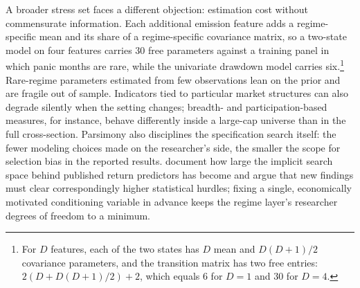 A broader stress set faces a different objection: estimation cost without commensurate information. Each additional emission feature adds a regime-specific mean and its share of a regime-specific covariance matrix, so a two-state model on four features carries 30 free parameters against a training panel in which panic months are rare, while the univariate drawdown model carries six.\footnote{For $D$ features, each of the two states has $D$ mean and $D(D+1)/2$ covariance parameters, and the transition matrix has two free entries: $2\left(D + D(D+1)/2\right) + 2$, which equals 6 for $D = 1$ and 30 for $D = 4$.} Rare-regime parameters estimated from few observations lean on the prior and are fragile out of sample. Indicators tied to particular market structures can also degrade silently when the setting changes; breadth- and participation-based measures, for instance, behave differently inside a large-cap universe than in the full cross-section. Parsimony also disciplines the specification search itself: the fewer modeling choices made on the researcher's side, the smaller the scope for selection bias in the reported results. \citet{HarveyLiuZhu2016} document how large the implicit search space behind published return predictors has become and argue that new findings must clear correspondingly higher statistical hurdles; fixing a single, economically motivated conditioning variable in advance keeps the regime layer's researcher degrees of freedom to a minimum.

